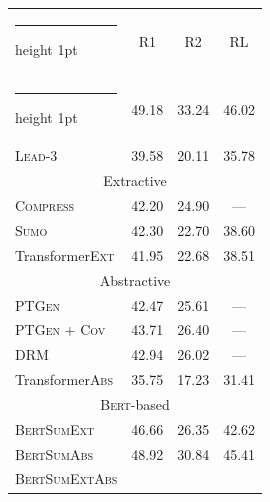 \documentclass[11pt,a4paper]{article}
\makeatletter
\newcommand{\thickhline}{%
    \noalign {\ifnum 0=`}\fi \hrule height 1pt
    \futurelet \reserved@a \@xhline
}
\makeatother
\begin{document}
    
    \begin{table}[t]
        \center
        \renewcommand{\arraystretch}{1.1}
        \begin{small}
            \begin{tabular}{lccc@{}} \thickhline
                \multicolumn{1}{l|}{Model}                                   & R1    & R2    & RL    \\ \thickhline
                \multicolumn{1}{l|}{\textsc{Oracle}}                                  &49.18& 33.24& 46.02 \\
                \multicolumn{1}{l|}{\textsc{Lead-3}}                                   & 39.58& 20.11 &35.78 \\ \hline
                \multicolumn{4}{c}{Extractive}                                                       \\\hline
                \multicolumn{1}{l|}{\textsc{Compress} \cite{durrett2016learning}}& 42.20  &24.90  &  --- \\ 
                \multicolumn{1}{l|}{\textsc{Sumo} \cite{yang19sumo}} &42.30& 22.70 &38.60 \\ 
                \multicolumn{1}{l|}{Transformer\textsc{Ext} }& 41.95 &22.68&38.51\\ \hline
                \multicolumn{4}{c}{Abstractive}                                                      \\ \hline
                
                \multicolumn{1}{l|}{\textsc{PTGen} \cite{see-acl17}      }             & 42.47 &  25.61 & --- \\
                \multicolumn{1}{l|}{\textsc{PTGen} + \textsc{Cov}  \cite{see-acl17}    }             & 43.71 &  26.40 & --- \\
                \multicolumn{1}{l|}{\textsc{DRM}   \cite{paulus2017deep}
                }             & 42.94 &  26.02 & --- \\
                \multicolumn{1}{l|}{Transformer\textsc{Abs}}& 35.75 &17.23&31.41\\ 
                \hline
                \multicolumn{4}{c}{\textsc{Bert}-based}                                                       \\ \hline
                \multicolumn{1}{l|}{\textsc{BertSumExt} }                             & 46.66 &26.35& 42.62 \\
                \multicolumn{1}{l|}{\textsc{BertSumAbs}}                              & 48.92   &30.84  &45.41\\
                \multicolumn{1}{l|}{\textsc{BertSumExtAbs} }
                

\end{tabular}
\end{small}
\end{table}
\end{document}
